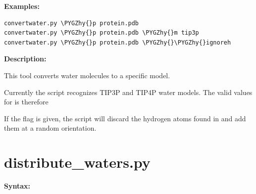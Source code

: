 \documentclass[letterpaper,10pt,english]{sphinxmanual}
\def\PYGZhy{\char`\-}
\begin{document}
\textbf{Examples:}

\begin{Verbatim}[commandchars=\\\{\}]
convertwater.py \PYGZhy{}p protein.pdb
convertwater.py \PYGZhy{}p protein.pdb \PYGZhy{}m tip3p
convertwater.py \PYGZhy{}p protein.pdb \PYGZhy{}\PYGZhy{}ignoreh
\end{Verbatim}

\textbf{Description:}

This tool converts water molecules to a specific model.

Currently the script recognizes TIP3P and TIP4P water models. The valid values for  is therefore 

If the  flag is given, the script will discard the hydrogen atoms found in  and add them at a random orientation.


\section{distribute\_waters.py}
\label{tools:distribute-waters-py}
\textbf{Syntax:}
\end{document}
